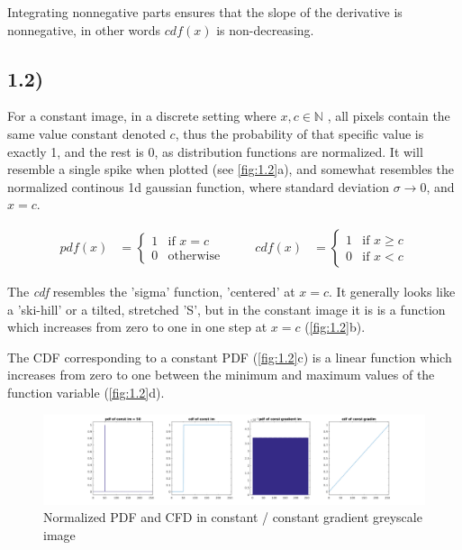 \documentclass[a4paper]{article}
\begin{document}
Integrating nonnegative parts ensures that the slope of the derivative is nonnegative, in other words $cdf(x)$ is non-decreasing.


\vfill
\subsection*{1.2)}

For a constant image, in a discrete setting where $x, c \in \mathbb{N}$ , all pixels contain the same value constant denoted $c$, thus the probability of that specific value is exactly 1, and the rest is 0, as distribution functions are normalized. It will resemble a single spike when plotted (see \autoref{fig:1.2}a), and somewhat resembles the normalized continous 1d gaussian function, where standard deviation $\sigma \rightarrow 0$, and $x=c$.

\begin{align}
pdf(x) &= \begin{cases} 1 & \text{if } x = c \\ 0 & \text{otherwise} \end{cases} &&&
cdf(x) &= \begin{cases} 1 & \text{if } x \geq c \\ 0 & \text{if } x < c \end{cases}
\end{align}

The \textit{cdf} resembles the 'sigma' function, 'centered' at $x=c$. It generally looks like a 'ski-hill' or a tilted, stretched 'S', but in the constant image it is is a function which increases from zero to one in one step at $x=c$ (\autoref{fig:1.2}b).

The CDF corresponding to a constant PDF (\autoref{fig:1.2}c) is a linear function which increases from zero to one between the minimum and maximum values of the function variable (\autoref{fig:1.2}d).

\begin{figure}[h!]
  \centering
  \includegraphics[width=\linewidth]{./1_2a.png}
  \caption{Normalized PDF and CFD in constant / constant gradient greyscale image}
  \label{fig:1.2}
\end{figure}
\end{document}
